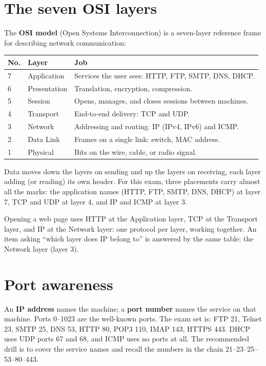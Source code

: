 \section{The seven OSI layers}
The \textbf{OSI model} (Open Systems Interconnection) is a seven-layer
reference frame for describing network communication:

\begin{center}
\begin{tabular}{p{}p{}p{}}
\toprule
\textbf{No.} & \textbf{Layer} & \textbf{Job} \\
\midrule
7 & Application & Services the user sees: HTTP, FTP, SMTP, DNS, DHCP. \\
6 & Presentation & Translation, encryption, compression. \\
5 & Session & Opens, manages, and closes sessions between machines. \\
4 & Transport & End-to-end delivery: TCP and UDP. \\
3 & Network & Addressing and routing: IP (IPv4, IPv6) and ICMP. \\
2 & Data Link & Frames on a single link: switch, MAC address. \\
1 & Physical & Bits on the wire, cable, or radio signal. \\
\bottomrule
\end{tabular}
\end{center}

Data moves down the layers on sending and up the layers on receiving, each
layer adding (or reading) its own header. For this exam, three placements
carry almost all the marks: the application names (HTTP, FTP, SMTP, DNS,
DHCP) at layer 7, TCP and UDP at layer 4, and IP and ICMP at layer 3.

\begin{example}
Opening a web page uses HTTP at the Application layer, TCP at the Transport
layer, and IP at the Network layer: one protocol per layer, working
together. An item asking ``which layer does IP belong to'' is answered by
the same table: the Network layer (layer 3).
\end{example}

\section{Port awareness}
An \textbf{IP address} names the machine; a \textbf{port number} names the
service on that machine. Ports 0--1023 are the well-known ports. The exam set
is: FTP 21, Telnet 23, SMTP 25, DNS 53, HTTP 80, POP3 110, IMAP 143, HTTPS
443. DHCP uses UDP ports 67 and 68, and ICMP uses no ports at all. The
recommended drill is to cover the service names and recall the numbers in the
chain 21--23--25--53--80--443.

